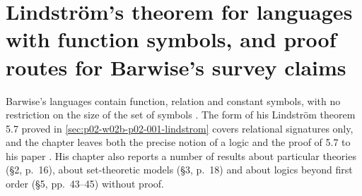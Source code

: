 \section{Lindstr\"om's theorem for languages with function symbols, and proof routes for Barwise's survey claims}
\label{sec:p02-w02c-p02-003-general-lindstrom}

Barwise's languages contain function, relation and constant symbols, with
no restriction on the size of the set of symbols
\cite[ch.~A.1, \S3, p.~17]{Barwise1977FirstOrder}.  The form of his
Lindstr\"om theorem 5.7 proved in \cref{sec:p02-w02b-p02-001-lindstrom}
covers relational signatures only, and the chapter leaves both the
precise notion of a logic and the proof of 5.7 to his paper
\cite{Barwise1974Axioms}.  His chapter also reports a number of results
about particular theories (\S2, p.~16), about set-theoretic models (\S3,
p.~18) and about logics beyond first order (\S5, pp.~43--45) without
proof.

